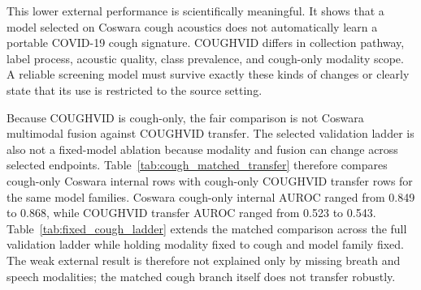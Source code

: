 \documentclass[preprint,12pt]{elsarticle}
\begin{document}
This lower external performance is scientifically meaningful. It shows that a model selected on Coswara cough acoustics does not automatically learn a portable COVID-19 cough signature. COUGHVID differs in collection pathway, label process, acoustic quality, class prevalence, and cough-only modality scope. A reliable screening model must survive exactly these kinds of changes or clearly state that its use is restricted to the source setting.

Because COUGHVID is cough-only, the fair comparison is not Coswara multimodal fusion against COUGHVID transfer. The selected validation ladder is also not a fixed-model ablation because modality and fusion can change across selected endpoints. Table~\ref{tab:cough_matched_transfer} therefore compares cough-only Coswara internal rows with cough-only COUGHVID transfer rows for the same model families. Coswara cough-only internal AUROC ranged from 0.849 to 0.868, while COUGHVID transfer AUROC ranged from 0.523 to 0.543. Table~\ref{tab:fixed_cough_ladder} extends the matched comparison across the full validation ladder while holding modality fixed to cough and model family fixed. The weak external result is therefore not explained only by missing breath and speech modalities; the matched cough branch itself does not transfer robustly.

\begin{table}[t]
\centering
\caption{COUGHVID cough-only external transfer. All rows use the ComParE+IS10 top-800 feature strategy selected from the Coswara source-domain training workflow and are evaluated on independent COUGHVID cough labels. High specificity with very low sensitivity, as in the LightGBM row, is not an acceptable screening tradeoff without a prospectively justified operating point.}
\label{tab:coughvid_transfer}
\end{table}
\end{document}
